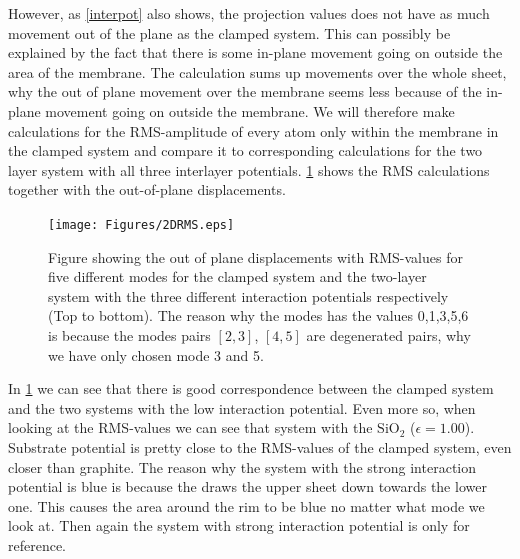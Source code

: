 However, as \cref{interpot} also shows, the projection values does not have as much movement out of the plane as the clamped system. This can possibly be explained by the fact that there is some in-plane movement going on outside the area of the membrane. The calculation sums up movements over the whole sheet, why the out of plane movement over the membrane seems less because of the in-plane movement going on outside the membrane. We will therefore make calculations for the RMS-amplitude of every atom only within the membrane in the clamped system and compare it to corresponding calculations for the two layer system with all three interlayer potentials. \cref{2DRMS} shows the RMS calculations together with the out-of-plane displacements. 
\onecolumngrid

\begin{figure}[H]
    \centering
    \texttt{[image: Figures/2DRMS.eps]}
    \caption{Figure showing the out of plane displacements with RMS-values for five different modes for the clamped system and the two-layer system with the three different interaction potentials respectively (Top to bottom). The reason why the modes has the values 0,1,3,5,6 is because the modes pairs $[2,3]$, $[4,5]$ are degenerated pairs, why we have only chosen mode 3 and 5.}
    \label{2DRMS}
\end{figure}
\twocolumngrid

In \cref{2DRMS} we can see that there is good correspondence between the clamped system and the two systems with the low interaction potential. Even more so, when looking at the RMS-values we can see that system with the $\text{SiO}_{2}$ ($\epsilon=1.00$). Substrate potential is pretty close to the RMS-values of the clamped system, even closer than graphite. The reason why the system with the strong interaction potential is blue is because the draws the upper sheet down towards the lower one. This causes the area around the rim to be blue no matter what mode we look at. Then again the system with strong interaction potential is only for reference. 